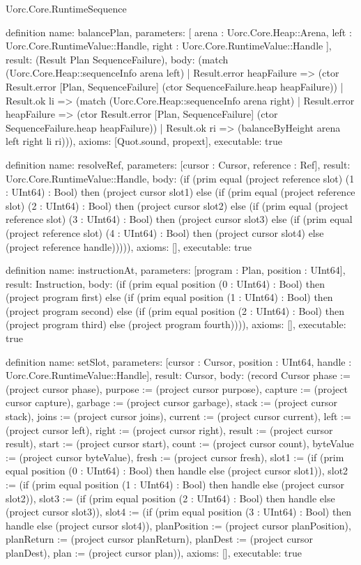 \begin{lexlean}{Uorc.Core.RuntimeSequence}
\begin{semanticmodule}
definition{
  name: balancePlan,
  parameters: [
    arena : Uorc.Core.Heap::Arena,
    left : Uorc.Core.RuntimeValue::Handle,
    right : Uorc.Core.RuntimeValue::Handle
  ],
  result: (Result Plan SequenceFailure),
  body: (match (Uorc.Core.Heap::sequenceInfo arena left)
    | Result.error heapFailure => (ctor Result.error [Plan, SequenceFailure] (ctor SequenceFailure.heap heapFailure))
    | Result.ok li => (match (Uorc.Core.Heap::sequenceInfo arena right)
      | Result.error heapFailure => (ctor Result.error [Plan, SequenceFailure] (ctor SequenceFailure.heap heapFailure))
      | Result.ok ri => (balanceByHeight arena left right li ri))),
  axioms: [Quot.sound, propext],
  executable: true
}

definition{
  name: resolveRef,
  parameters: [cursor : Cursor, reference : Ref],
  result: Uorc.Core.RuntimeValue::Handle,
  body: (if (prim equal (project reference slot) (1 : UInt64) : Bool) then (project cursor slot1) else (if (prim equal (project reference slot) (2 : UInt64) : Bool) then (project cursor slot2) else (if (prim equal (project reference slot) (3 : UInt64) : Bool) then (project cursor slot3) else (if (prim equal (project reference slot) (4 : UInt64) : Bool) then (project cursor slot4) else (project reference handle))))),
  axioms: [],
  executable: true
}

definition{
  name: instructionAt,
  parameters: [program : Plan, position : UInt64],
  result: Instruction,
  body: (if (prim equal position (0 : UInt64) : Bool) then (project program first) else (if (prim equal position (1 : UInt64) : Bool) then (project program second) else (if (prim equal position (2 : UInt64) : Bool) then (project program third) else (project program fourth)))),
  axioms: [],
  executable: true
}

definition{
  name: setSlot,
  parameters: [cursor : Cursor, position : UInt64, handle : Uorc.Core.RuntimeValue::Handle],
  result: Cursor,
  body: (record Cursor {phase := (project cursor phase), purpose := (project cursor purpose), capture := (project cursor capture), garbage := (project cursor garbage), stack := (project cursor stack), joins := (project cursor joins), current := (project cursor current), left := (project cursor left), right := (project cursor right), result := (project cursor result), start := (project cursor start), count := (project cursor count), byteValue := (project cursor byteValue), fresh := (project cursor fresh), slot1 := (if (prim equal position (0 : UInt64) : Bool) then handle else (project cursor slot1)), slot2 := (if (prim equal position (1 : UInt64) : Bool) then handle else (project cursor slot2)), slot3 := (if (prim equal position (2 : UInt64) : Bool) then handle else (project cursor slot3)), slot4 := (if (prim equal position (3 : UInt64) : Bool) then handle else (project cursor slot4)), planPosition := (project cursor planPosition), planReturn := (project cursor planReturn), planDest := (project cursor planDest), plan := (project cursor plan)}),
  axioms: [],
  executable: true
}


\end{semanticmodule}
\end{lexlean}
